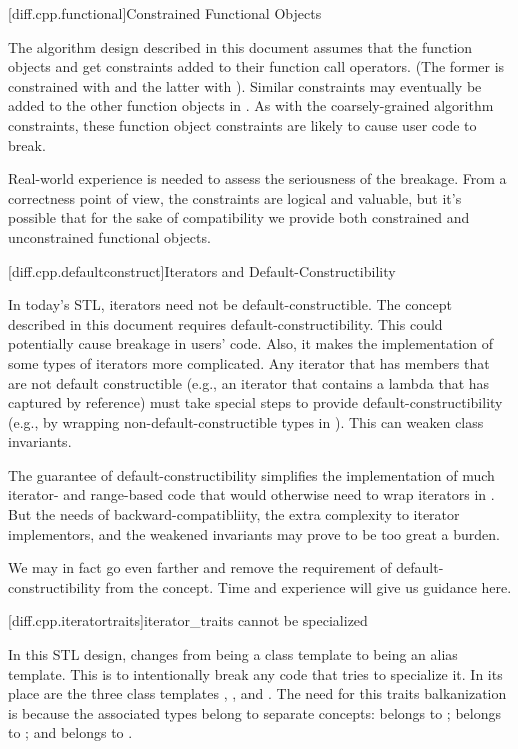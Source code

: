 [diff.cpp.functional]{Constrained Functional Objects}

\pnum
The algorithm design described in this document assumes that the function objects
 and  get constraints added to their function call operators.
(The former is constrained with  and the latter with
). Similar constraints may eventually be added to the other function objects
in . As with the coarsely-grained algorithm constraints, these function object
constraints are likely to cause user code to break.

\pnum
Real-world experience is needed to assess the seriousness of the breakage. From a correctness point
of view, the constraints are logical and valuable, but it's possible that for the sake of
compatibility we provide both constrained and unconstrained functional objects.

[diff.cpp.defaultconstruct]{Iterators and Default-Constructibility}

\pnum
In today's STL, iterators need not be default-constructible. The  concept described
in this document requires default-constructibility. This could potentially cause breakage in users'
code. Also, it makes the implementation of some types of iterators more complicated. Any iterator
that has members that are not default constructible (e.g., an iterator that contains a lambda that
has captured by reference) must take special steps to provide default-constructibility (e.g.,
by wrapping non-default-constructible types in ). This can weaken class
invariants.

\pnum
The guarantee of default-constructibility simplifies the implementation of much iterator- and
range-based code that would otherwise need to wrap iterators in . But the
needs of backward-compatibliity, the extra complexity to iterator implementors, and the weakened
invariants may prove to be too great a burden.

\pnum
We may in fact go even farther and remove the requirement of default-constructibility from the
 concept. Time and experience will give us guidance here.

[diff.cpp.iteratortraits]{iterator_traits cannot be specialized}

\pnum
In this STL design,  changes from being a class template to being an
alias template. This is to intentionally break any code that tries to specialize it. In its place
are the three class templates , , and
. The need for this traits balkanization is because the associated types
belong to separate concepts:  belongs to ;
 belongs to ; and  belongs to
.

